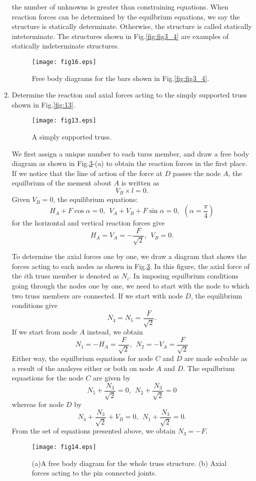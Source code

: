 \documentclass[10pt,a4j]{article}
\begin{document}
\begin{enumerate}
{	the number of unknowns is greater than constraining equations.  
	When reaction forces can be determined by the equilbrium equations, 
	we say the structure is statically determinate. Otherwise, the structure is 
	called statically inteterminate. The structures shown in Fig.\ref{fig:fig3_4} are 
	 examples of statically indeterminate structures.
}
\begin{figure}[h]
	\begin{center}
	\texttt{[image: fig16.eps]} 
	\end{center}
	\caption{Free body diagrams for the bars shown in Fig.\ref{fig:fig3_4}.} 
	\label{fig:fig16}
\end{figure}
\item
	Determine the reaction and axial forces acting to the simply supported 
	truss shown in Fig.\ref{fig:13}.
\begin{figure}[h]
	\begin{center}
	\texttt{[image: fig13.eps]} 
	\end{center}
	\caption{A simply supported truss. } 
	\label{fig:fig13}
\end{figure}
{\small 
	We first assign a unique number to each turss member, and draw 
	a free body diagram as shown in Fig.\ref{fig:fig14}-(a) to 
	obtain the reaction forces in the first place. 
	If we notice that the line of action of the force at $D$ passes the node $A$, 
	the equilbrium of the mement about $A$ is written as  
	\[
		V_B\times l =0.
	\]
	Given $V_B=0$, the equilibrium equations: 
	\[ 
		H_A+F\cos\alpha =0 , \ \ V_A+V_B+F\sin\alpha=0, \ \ \left( \alpha=\frac{\pi}{4}\right)
	\]
	for the horizontal and vertical reaction forces give
	\[
		H_A=V_A=-\frac{F}{\sqrt{2}}, \ \ V_B=0.
	\]

	To determine the axial forces one by one, we draw a diagram 
	that shows the forces acting to each nodes as shown 
	in Fig.\ref{fig:fig14}. In this figure, the axial force of the $i$th 
	truss member is denoted as $N_i$.
	In imposing equilbrium conditions going through the nodes one by one, 
	we need to start with the node to which two truss members are connected.
	If we start with node $D$, the equilibrium conditions give
	\[ 
		N_4=N_5=\frac{F}{\sqrt{2}}.
	\]
	If we start from node $A$ instead, we obtain
	\[
		N_1=-H_A=\frac{F}{\sqrt{2}}, \ \ 
		N_2=-V_A=\frac{F}{\sqrt{2}}
	\]
	Either way, the equilbrium equations for node $C$ and $D$ are made 
	solvable as a result of the analsyes either or both on node $A$ and $D$.
	The equilbrium equastions for the node $C$ are given by 
	\[
		N_5+\frac{N_3}{\sqrt{2}}=0, \ \ 
		N_2+\frac{N_3}{\sqrt{2}}=0
	\]
	whereas for node $D$ by
	\[
		N_4+\frac{N_3}{\sqrt{2}}+V_B=0, \ \ 
		N_1+\frac{N_3}{\sqrt{2}}=0.
	\]
	From the set of equations presented above, we obtain $N_3=-F$.
}
\begin{figure}[h]
	\begin{center}
	\texttt{[image: fig14.eps]} 
	\end{center}
	\caption{(a)A free body diagram for the whole truss structure.
	(b) Axial forces acting to the pin connected joints.} 
	\label{fig:fig14}
\end{figure}
\end{enumerate}
\end{document}
